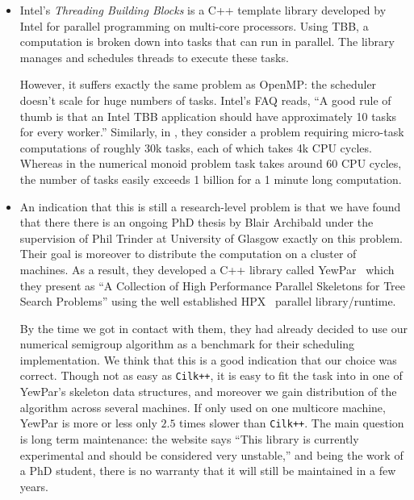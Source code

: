 \documentclass{deliverablereport}
\newcommand{\CilkP}{\texttt{Cilk++}\xspace}
\begin{document}
\begin{itemize}
  Unfortunately, for tcomputations like numerical semigroups, there
  is a huge number of small tasks that are spawned. We used the implementation
  from the GCC compiler. At the time of our experiment, the finding was that the
  scheduler doesn't scale to this huge number of tasks required. The scheduling overhead
  was several order of magnitude larger than \CilkP making it unusable for
  these kinds of computations.

\item Intel's \emph{Threading Building Blocks} is a C++ template library
  developed by Intel for parallel programming on multi-core processors. Using
  TBB, a computation is broken down into tasks that can run in parallel. The
  library manages and schedules threads to execute these tasks.

  However, it suffers exactly the same problem as OpenMP: the scheduler
  doesn't scale for huge numbers of tasks. Intel's FAQ reads, ``A good rule of
  thumb is that an Intel TBB application should have approximately 10 tasks
  for every worker.'' Similarly, in \cite{LuLi}, they consider a problem
  requiring micro-task computations of roughly 30k tasks, each of which takes 4k
  CPU cycles. Whereas in the numerical monoid problem task takes around 60
  CPU cycles, the number of tasks easily exceeds 1 billion for a 1 minute long
  computation.

\item An indication that this is still a research-level problem is that we
  have found that there there is an ongoing PhD thesis by Blair Archibald under
  the supervision of Phil Trinder at University of Glasgow exactly on this
  problem. Their goal is moreover to distribute the computation on a cluster
  of machines. As a result, they developed a C++ library called
  YewPar~\cite{YewPar} which they present as ``A Collection of High
  Performance Parallel Skeletons for Tree Search Problems'' using the well
  established HPX~\cite{HPX} parallel library/runtime.

  By the time we got in contact with them, they had already decided to use our numerical
  semigroup algorithm as a benchmark for their scheduling implementation. We
  think that this is a good indication that our choice was correct. Though not
  as easy as \CilkP, it is easy to fit the task into in one of YewPar's skeleton data structures, and moreover
  we gain distribution of the algorithm across several machines. If only used on
  one multicore machine, YewPar is more or less only $2.5$ times slower than
  \CilkP. The main question is long term maintenance: the website says ``This
  library is currently experimental and should be considered very unstable,''
  and being the work of a PhD student, there is no warranty that it will
  still be maintained in a few years.


\end{itemize}
\end{document}
